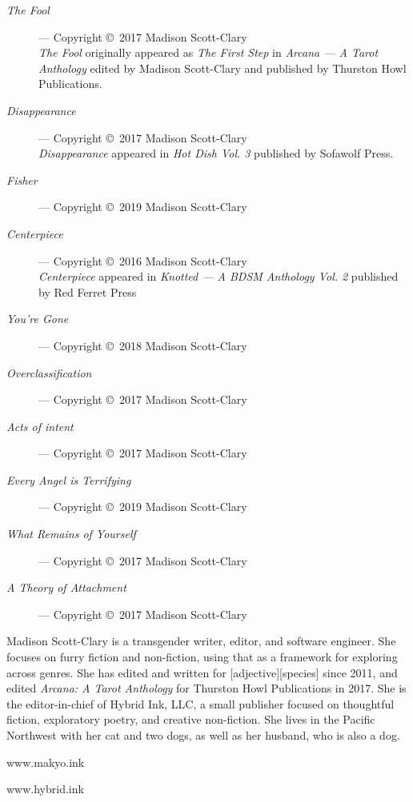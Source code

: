 \begin{description}
    \item[\emph{The Fool}]
    --- Copyright \copyright\ 2017 Madison Scott-Clary\\
    \emph{The Fool} originally appeared as \emph{The First Step} in \emph{Arcana --- A Tarot Anthology} edited by Madison Scott-Clary and published by Thurston Howl Publications.

    \item[\emph{Disappearance}]
    --- Copyright \copyright\ 2017 Madison Scott-Clary\\
    \emph{Disappearance} appeared in \emph{Hot Dish Vol. 3} published by Sofawolf Press.

    \item[\emph{Fisher}]
    --- Copyright \copyright\ 2019 Madison Scott-Clary

    \item[\emph{Centerpiece}]
    --- Copyright \copyright\ 2016 Madison Scott-Clary\\
    \emph{Centerpiece} appeared in \emph{Knotted --- A BDSM Anthology Vol. 2} published by Red Ferret Press

    \item[\emph{You're Gone}]
    --- Copyright \copyright\ 2018 Madison Scott-Clary

    \item[\emph{Overclassification}]
    --- Copyright \copyright\ 2017 Madison Scott-Clary

    \item[\emph{Acts of intent}]
    --- Copyright \copyright\ 2017 Madison Scott-Clary

    \item[\emph{Every Angel is Terrifying}]
    --- Copyright \copyright\ 2019 Madison Scott-Clary

    \item[\emph{What Remains of Yourself}]
    --- Copyright \copyright\ 2017 Madison Scott-Clary

    \item[\emph{A Theory of Attachment}]
    --- Copyright \copyright\ 2017 Madison Scott-Clary
\end{description}
\newpage
\thispagestyle{empty}
\null
\vfill

\noindent Madison Scott-Clary is a transgender writer, editor, and software engineer. She focuses on furry fiction and non-fiction, using that as a framework for exploring across genres. She has edited and written for [adjective][species] since 2011, and edited \emph{Arcana: A Tarot Anthology} for Thurston Howl Publications in 2017. She is the editor-in-chief of Hybrid Ink, LLC, a small publisher focused on thoughtful fiction, exploratory poetry, and creative non-fiction. She lives in the Pacific Northwest with her cat and two dogs, as well as her husband, who is also a dog.

\begin{center}
    www.makyo.ink

    www.hybrid.ink
\end{center}

\vfill
